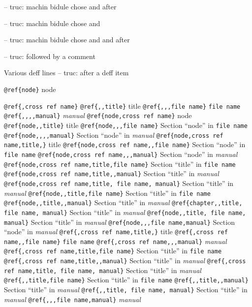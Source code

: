 \documentclass{book}
\begin{document}
%
\hbox{}-- truc: machin bidule chose and  after


%
\hbox{}-- truc: machin bidule chose and 


%
\hbox{}-- truc: machin bidule chose and and after


%
\hbox{}-- truc: followed by a comment


%
Various deff lines
\hbox{}-- truc: after a deff item


%

\texttt{@ref\{node\}} node

\texttt{@ref\{,cross ref name\}} 
\texttt{@ref\{,,title\}} title
\texttt{@ref\{,,,file name\}} \texttt{file name}
\texttt{@ref\{,,,,manual\}} \textit{manual}
\texttt{@ref\{node,cross ref name\}} node
\texttt{@ref\{node,,title\}} title
\texttt{@ref\{node,,,file name\}} Section ``node'' in \texttt{file name}
\texttt{@ref\{node,,,,manual\}} Section ``node'' in \textit{manual}
\texttt{@ref\{node,cross ref name,title,\}} title
\texttt{@ref\{node,cross ref name,,file name\}} Section ``node'' in \texttt{file name}
\texttt{@ref\{node,cross ref name,,,manual\}} Section ``node'' in \textit{manual}
\texttt{@ref\{node,cross ref name,title,file name\}} Section ``title'' in \texttt{file name}
\texttt{@ref\{node,cross ref name,title,,manual\}} Section ``title'' in \textit{manual}
\texttt{@ref\{node,cross ref name,title, file name, manual\}} Section ``title'' in \textit{manual}
\texttt{@ref\{node,,title,file name\}} Section ``title'' in \texttt{file name}
\texttt{@ref\{node,,title,,manual\}} Section ``title'' in \textit{manual}
\texttt{@ref\{chapter,,title, file name, manual\}} Section ``title'' in \textit{manual}
\texttt{@ref\{node,,title, file name, manual\}} Section ``title'' in \textit{manual}
\texttt{@ref\{node,,,file name,manual\}} Section ``node'' in \textit{manual}
\texttt{@ref\{,cross ref name,title,\}} title
\texttt{@ref\{,cross ref name,,file name\}} \texttt{file name}
\texttt{@ref\{,cross ref name,,,manual\}} \textit{manual}
\texttt{@ref\{,cross ref name,title,file name\}} Section ``title'' in \texttt{file name}
\texttt{@ref\{,cross ref name,title,,manual\}} Section ``title'' in \textit{manual}
\texttt{@ref\{,cross ref name,title, file name, manual\}} Section ``title'' in \textit{manual}
\texttt{@ref\{,,title,file name\}} Section ``title'' in \texttt{file name}
\texttt{@ref\{,,title,,manual\}} Section ``title'' in \textit{manual}
\texttt{@ref\{,,title, file name, manual\}} Section ``title'' in \textit{manual}
\texttt{@ref\{,,,file name,manual\}} \textit{manual}
\end{document}
